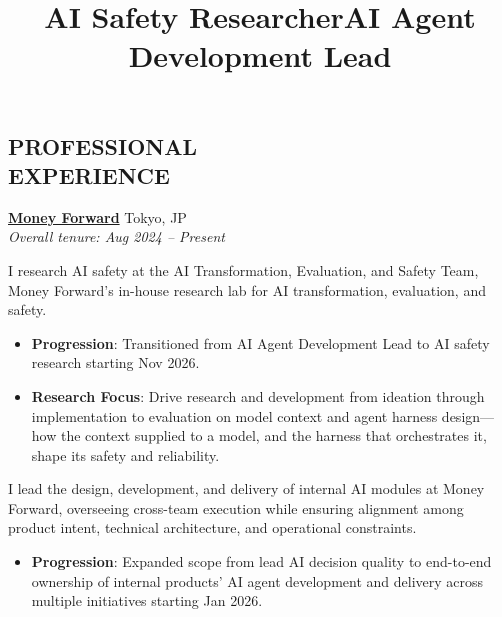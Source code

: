 \documentclass[margin]{res}
\begin{document}
\begin{resume}
\section{PROFESSIONAL\\EXPERIENCE}


\noindent\textbf{\href{https://corp.moneyforward.com/en/}{Money Forward}} \hfill Tokyo, JP\\
\noindent\textit{Overall tenure: Aug 2024 -- Present}\par\vspace{-2mm}
\employer{} %
\location{} %
\title{\textbf{AI Safety Researcher}}
\begin{position}
I research AI safety at the AI Transformation, Evaluation, and Safety Team, Money Forward's in-house research lab for AI transformation, evaluation, and safety.\\
\vspace{-3mm}
\begin{itemize}
    \item \textbf{Progression}: Transitioned from AI Agent Development Lead to AI safety research starting Nov 2026.
    \item \textbf{Research Focus}: Drive research and development from ideation through implementation to evaluation on model context and agent harness design---how the context supplied to a model, and the harness that orchestrates it, shape its safety and reliability.
\end{itemize}
\end{position}
\newpage
\employer{} %
\location{} %
\title{\textbf{AI Agent Development Lead}}
\begin{position}
I lead the design, development, and delivery of internal AI modules at Money Forward, overseeing cross-team execution while ensuring alignment among product intent, technical architecture, and operational constraints.\\
\vspace{-3mm}
\begin{itemize}
    \item \textbf{Progression}: Expanded scope from lead AI decision quality to end-to-end ownership of internal products' AI agent development and delivery across multiple initiatives starting Jan 2026.

\end{itemize}
\end{position}
\end{resume}
\end{document}
